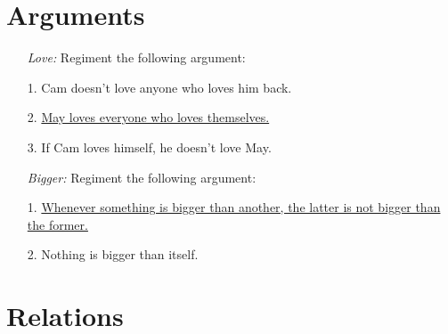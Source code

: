 \documentclass[a4paper, 11pt]{article} %
\begin{document}
\section*{Arguments}

\begin{enumerate}
  \item[\it Love:] Regiment the following argument:
    \item[1.] Cam doesn't love anyone who loves him back.
    \item[2.] \underline{May loves everyone who loves themselves.\quad}
    \item[3.] If Cam loves himself, he doesn't love May.
  \item[\it Bigger:] Regiment the following argument:
    \item[1.] \underline{Whenever something is bigger than another, the latter is not bigger than the former.\quad}
    \item[2.] Nothing is bigger than itself.
\end{enumerate}


\section*{Relations}
\end{document}
